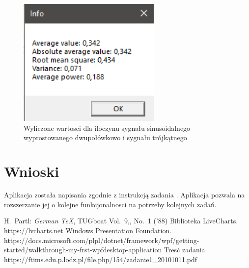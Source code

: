 \documentclass[12pt]{article}
\begin{document}
\begin{figure}[H]
 \centering
 \includegraphics[width=7cm]{images/mulfulltrian1info.PNG}
 \vspace{-0.3cm}
 \caption{Wyliczone wartosci dla iloczynu sygnału sinusoidalnego wyprostowanego dwupołówkowo i sygnału trójkątnego}
 \label{gui}
\end{figure}



\newpage

\section{Wnioski}

Aplikacja została napisania zgodnie z instrukcją zadania \cite{zad}. Aplikacja pozwala na rozszerzanie jej o kolejne funkcjonalnosci na potrzeby kolejnych zadań. 





\begin{thebibliography}{99}
 H.~Partl:
\emph{German \TeX},
TUGboat Vol.~9,, No.~1 ('88)
 Biblioteka LiveCharts. https://lvcharts.net
 Windows Presentation Foundation. https://docs.microsoft.com/plpl/dotnet/framework/wpf/getting-started/walkthrough-my-frst-wpfdesktop-application
 Tresć zadania https://ftims.edu.p.lodz.pl/file.php/154/zadanie1\_20101011.pdf
\end{thebibliography}
\end{document}
